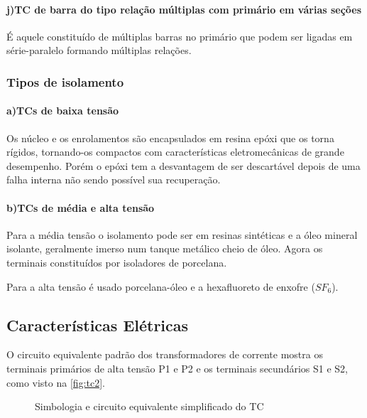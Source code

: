 				\paragraph*{j)\indent TC de barra do tipo relação múltiplas com primário em várias seções}
					É aquele constituído de múltiplas barras no primário que podem ser ligadas em série-paralelo formando múltiplas relações.
			
			\subsubsection{Tipos de isolamento}
				\paragraph*{a)\indent TCs de baixa tensão}
					Os núcleo e os enrolamentos são encapsulados em resina epóxi que os torna rígidos, tornando-os compactos com características eletromecânicas de grande desempenho. Porém o epóxi tem a desvantagem de ser descartável depois de uma falha interna não sendo possível sua recuperação.
				\paragraph*{b)\indent TCs de média e alta tensão}
					Para a média tensão o isolamento pode ser em resinas sintéticas e a óleo mineral isolante, geralmente imerso num tanque metálico cheio de óleo. Agora os terminais constituídos por isoladores de porcelana.\par
					Para a alta tensão é usado porcelana-óleo e a hexafluoreto de enxofre ($SF_6$).\par

		\subsection{Características Elétricas}
			O circuito equivalente padrão dos transformadores de corrente mostra os terminais primários de alta tensão P1 e P2 e os terminais secundários S1 e S2, como visto na \autoref{fig:tc2}.\par
			\begin{figure}[htb]
				\caption{Simbologia e circuito equivalente simplificado do TC}
				\centering
				\end{figure}
			
